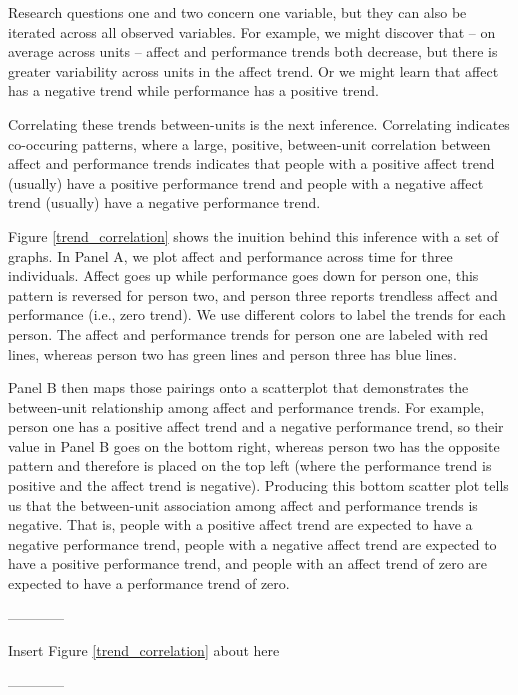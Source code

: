\documentclass[english,,man]{apa6}
\theoremstyle{definition}
\theoremstyle{definition}
\theoremstyle{definition}
\theoremstyle{remark}
\begin{document}
Research questions one and two concern one variable, but they can also
be iterated across all observed variables. For example, we might
discover that -- on average across units -- affect and performance
trends both decrease, but there is greater variability across units in
the affect trend. Or we might learn that affect has a negative trend
while performance has a positive trend.

Correlating these trends between-units is the next inference.
Correlating indicates co-occuring patterns, where a large, positive,
between-unit correlation between affect and performance trends indicates
that people with a positive affect trend (usually) have a positive
performance trend and people with a negative affect trend (usually) have
a negative performance trend.

Figure \ref{trend_correlation} shows the inuition behind this inference
with a set of graphs. In Panel A, we plot affect and performance across
time for three individuals. Affect goes up while performance goes down
for person one, this pattern is reversed for person two, and person
three reports trendless affect and performance (i.e., zero trend). We
use different colors to label the trends for each person. The affect and
performance trends for person one are labeled with red lines, whereas
person two has green lines and person three has blue lines.

Panel B then maps those pairings onto a scatterplot that demonstrates
the between-unit relationship among affect and performance trends. For
example, person one has a positive affect trend and a negative
performance trend, so their value in Panel B goes on the bottom right,
whereas person two has the opposite pattern and therefore is placed on
the top left (where the performance trend is positive and the affect
trend is negative). Producing this bottom scatter plot tells us that the
between-unit association among affect and performance trends is
negative. That is, people with a positive affect trend are expected to
have a negative performance trend, people with a negative affect trend
are expected to have a positive performance trend, and people with an
affect trend of zero are expected to have a performance trend of zero.

\begin{center}

------------

Insert Figure \ref{trend_correlation} about here

------------

\end{center}
\end{document}
